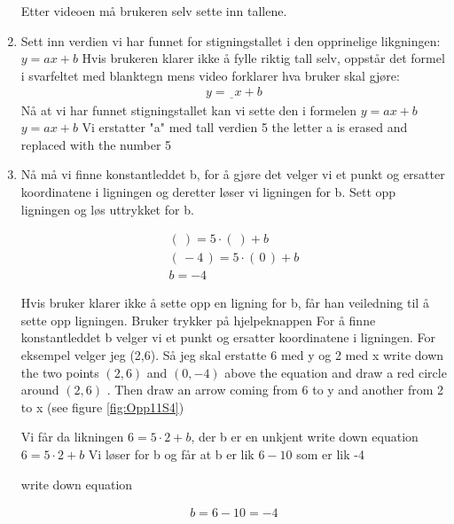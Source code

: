 \documentclass[12pt,twoside,onecolumn]{article}
\begin{document}
\begin{Exercise}
\begin{enumerate}
{\color{Maroon}  Etter videoen må brukeren selv sette inn tallene.}

\item Sett inn verdien vi har funnet for stigningstallet i den opprinelige likgningen: $y = ax + b$
{\color{Maroon}
Hvis brukeren klarer ikke å fylle riktig tall selv, oppstår det formel i svarfeltet med blanktegn mens video forklarer hva bruker skal gjøre: 
\begin{align}
y = \underline{\phantom{0}}x + b
\end{align}}
{\color{gray} Nå at vi har funnet stigningstallet kan vi sette den i formelen  $y = ax + b$ }
{\color{PineGreen} $y = ax + b$  }
{\color{gray}Vi erstatter "a" med tall verdien 5 }
{\color{PineGreen} the letter a is erased and replaced with the number 5 }


\item Nå  må vi  finne konstantleddet b, for å gjøre det velger vi et punkt og ersatter koordinatene i ligningen og deretter løser vi ligningen for b. Sett opp ligningen og løs uttrykket for b.

\begin{align}
(\:) = 5\cdot(\:) + b\\
(\, -4 \, ) = 5\cdot (\, 0 \, ) + b \\
b = -4
\end{align}

{\color{Maroon} Hvis bruker klarer ikke å sette opp en ligning for b, får han veiledning til å sette opp ligningen. Bruker trykker på hjelpeknappen}
{\color{gray}For å  finne konstantleddet b  velger vi et punkt og ersatter koordinatene i ligningen. For eksempel velger jeg (2,6). Så jeg skal erstatte 6 med y og 2 med x}
{\color{PineGreen} write down the two points  $(2,6)$  and  $(0,-4 )$ above the equation and draw a red circle around $(2,6)$ . Then draw an arrow coming from 6 to y and another from 2 to x (see figure \ref{fig:Opp11S4})}
\newline

{\color{gray} Vi får da likningen $6=5\cdot 2+b$, der b er en unkjent}
{\color{PineGreen} write down equation 
\newline
$6=5\cdot 2+b$  }
\newline
\newline
{\color{gray} Vi løser for b og får at b er lik $6-10$ som er lik -4}

{\color{PineGreen} write down equation

 \begin{align}
b=6-10=-4
\end{align}  }




\end{enumerate}
\end{Exercise}
\end{document}
